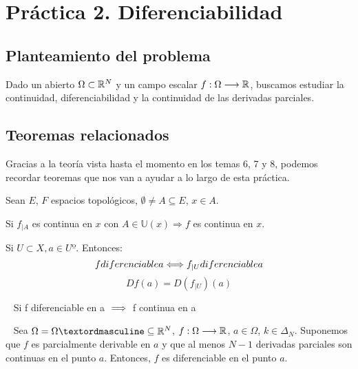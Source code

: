 \chapter{Práctica 2. Diferenciabilidad}

\section{Planteamiento del problema}
\noindent
Dado un abierto $\Omega \subset \mathbb R^N$ y un campo escalar $f:\Omega \longrightarrow \mathbb R$, buscamos estudiar la continuidad, diferenciabilidad y la continuidad de las derivadas parciales.

\section{Teoremas relacionados}
\noindent
Gracias a la teoría vista hasta el momento en los temas 6, 7 y 8, podemos recordar teoremas que nos van a ayudar a lo largo de esta práctica.

\begin{teo}
    Sean $E$, $F$ espacios topológicos, $\emptyset \neq A \subseteq E$, $x \in A$.

    
    Si $f_{\big| A}$ es continua en $x$ con $A \in \mathbb{U}(x) \Rightarrow f$ es continua en $x$.
\end{teo}

\begin{prop}
    Si $U\subset X, a\in Uº$. \newline Entonces: 
    $$f \\ diferenciable \\ a \\ \Longleftrightarrow \\ f_{|U} \\ diferenciable\\ a$$
    $$Df(a) = D(f_{|U})(a)$$
\end{prop}

\begin{prop}
    \ \newline
    Si f diferenciable en a $\implies $ f continua en a 
\end{prop}

\begin{prop}
    \ \newline
    Sea $\Omega = \Omegaº \subseteq \rn$, $f:\Omega \longrightarrow \mathbb R$, $a \in \Omega$, $k \in \Delta_N$.\newline
    Suponemos que $f$ es parcialmente derivable en $a$ y que al menos $N-1$ derivadas parciales son continuas en el punto $a$.\newline
    Entonces, $f$ es diferenciable en el punto $a$.
\end{prop}

